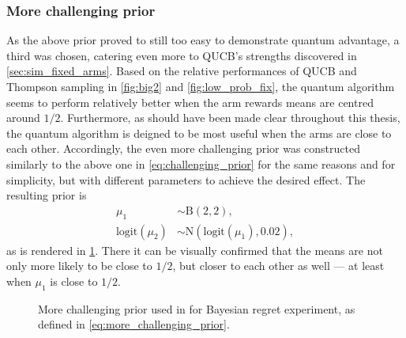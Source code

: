 \clearpage
\vspace{2cm}
\subsubsection{More challenging prior}
As the above prior proved to still too easy to demonstrate quantum advantage, a third was chosen, catering even more to QUCB's strengths discovered in \cref{sec:sim_fixed_arms}.
Based on the relative performances of QUCB and Thompson sampling in \cref{fig:big2} and \cref{fig:low_prob_fix}, the quantum algorithm seems to perform relatively better when the arm rewards means are centred around $1/2$.
Furthermore, as should have been made clear throughout this thesis, the quantum algorithm is deigned to be most useful when the arms are close to each other.
Accordingly, the even more challenging prior was constructed similarly to the above one in \cref{eq:challenging_prior} for the same reasons and for simplicity, but with different parameters to achieve the desired effect.
The resulting prior is
\begin{equation}
    \label{eq:more_challenging_prior}
    \begin{aligned}
        \mu_1               & \sim \text{B}(2, 2),                      \\
        \text{logit}(\mu_2) & \sim \text{N}(\text{logit}(\mu_1), 0.02),
    \end{aligned}
\end{equation}
as is rendered in \cref{fig:prior2}.
There it can be visually confirmed that the means are not only more likely to be close to $1/2$, but closer to each other as well — at least when $\mu_1$ is close to $1/2$.

\begin{figure}[p]
    \centering
    \caption[
        More challenging prior used in Bayesian regret experiment.
    ]
    {
        More challenging prior used in for Bayesian regret experiment, as defined in \cref{eq:more_challenging_prior}.
    }
    \label{fig:prior2}
\end{figure}


